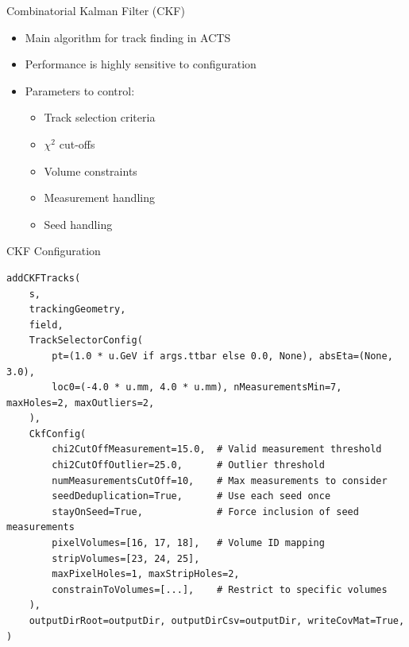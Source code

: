 \documentclass[lualatex,aspectratio=169,t,13pt,dvipsnames]{beamer}
\begin{document}
\begin{frame}{Combinatorial Kalman Filter (CKF)}
  \begin{itemize}
    \item Main algorithm for track finding in ACTS
    \item Performance is highly sensitive to configuration
    \item Parameters to control:
    \begin{itemize}
      \item Track selection criteria
      \item $\chi^2$ cut-offs
      \item Volume constraints
      \item Measurement handling
      \item Seed handling
    \end{itemize}
  \end{itemize}
\end{frame}

\begin{frame}[fragile]{CKF Configuration}
  \begin{verbatim}
addCKFTracks(
    s,
    trackingGeometry,
    field,
    TrackSelectorConfig(
        pt=(1.0 * u.GeV if args.ttbar else 0.0, None), absEta=(None, 3.0),
        loc0=(-4.0 * u.mm, 4.0 * u.mm), nMeasurementsMin=7, maxHoles=2, maxOutliers=2,
    ),
    CkfConfig(
        chi2CutOffMeasurement=15.0,  # Valid measurement threshold
        chi2CutOffOutlier=25.0,      # Outlier threshold
        numMeasurementsCutOff=10,    # Max measurements to consider
        seedDeduplication=True,      # Use each seed once
        stayOnSeed=True,             # Force inclusion of seed measurements
        pixelVolumes=[16, 17, 18],   # Volume ID mapping
        stripVolumes=[23, 24, 25],
        maxPixelHoles=1, maxStripHoles=2,
        constrainToVolumes=[...],    # Restrict to specific volumes
    ),
    outputDirRoot=outputDir, outputDirCsv=outputDir, writeCovMat=True,
)
  \end{verbatim}
\end{frame}
\end{document}
